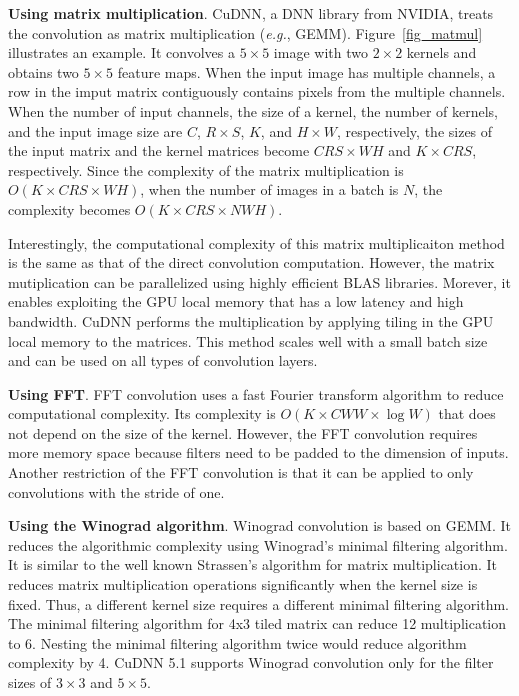{\bf Using matrix multiplication}. CuDNN\cite{cudnn}, a DNN library from NVIDIA, treats the convolution as matrix multiplication (\textit{e.g.}, GEMM\cite{cublas}). Figure~\ref{fig_matmul} illustrates an example. It convolves a $5 \times 5$ image with two $2 \times 2$ kernels and obtains two $5 \times 5$ feature maps. When the input image has multiple channels, a row in the imput matrix contiguously contains pixels from the multiple channels. When the number of input channels, the size of a kernel, the number of kernels, and the input image size are $C$, $R \times S$, $K$, and $H \times W$, respectively, the sizes of the input matrix and the kernel matrices become $CRS \times WH$ and $K \times CRS$, respectively. Since the complexity of the matrix multiplication is $O(K \times CRS \times WH)$, when the number of images in a batch is $N$, the complexity becomes $O(K \times CRS \times NWH)$. 

Interestingly, the computational complexity of this matrix multiplicaiton method is the same as that of the direct convolution computation. However, the matrix mutiplication can be parallelized using highly efficient BLAS libraries\cite{cublas}. Morever, it enables exploiting the GPU local memory that has a low latency and high bandwidth. CuDNN performs the multiplication by applying tiling in the GPU local memory to the matrices. This method scales well with a small batch size and can be used on all types of convolution layers. 

{\bf Using FFT}. FFT convolution uses a fast Fourier transform algorithm to reduce computational complexity\cite{fftconv}. Its complexity is $O(K \times CWW \times \log W)$ that does not depend on the size of the kernel. However, the FFT convolution requires more memory space because filters need to be padded to the dimension of inputs. Another restriction of the FFT convolution is that it can be applied to only convolutions with the stride of one.

{\bf Using the Winograd algorithm}. Winograd convolution is based on GEMM\cite{cublas}. It reduces the algorithmic complexity using Winograd's minimal filtering algorithm\cite{winograd}. It is similar to the well known Strassen's algorithm\cite{winograd1980arithmetic} for matrix multiplication. It reduces matrix multiplication operations significantly when the kernel size is fixed. Thus, a different kernel size requires a different minimal filtering algorithm. The minimal filtering algorithm for 4x3 tiled matrix can reduce 12 multiplication to 6. Nesting the minimal filtering algorithm twice would reduce algorithm complexity by 4\cite{winograd}. CuDNN 5.1 supports Winograd convolution only for the filter sizes of $3 \times 3$ and $5 \times 5$.

